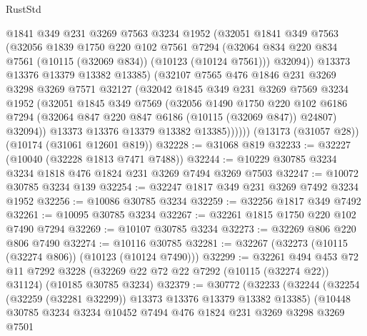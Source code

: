 \begin{lexlean}{RustStd}
\begin{coremodule}
              @1841
              @349
              @231
              @3269
              @7563
              @3234
              @1952
              (@32051
                @1841
                @349
                @7563
                (@32056
                  @1839
                  @1750
                  @220
                  @102
                  @7561
                  @7294
                  (@32064 @834 @220 @834 @7561 (@10115 (@32069 @834)) (@10123 (@10124 @7561)))
                  @32094))
              @13373
              @13376
              @13379
              @13382
              @13385)
            (@32107
              @7565
              @476
              @1846
              @231
              @3269
              @3298
              @3269
              @7571
              @32127
              (@32042
                @1845
                @349
                @231
                @3269
                @7569
                @3234
                @1952
                (@32051
                  @1845
                  @349
                  @7569
                  (@32056
                    @1490
                    @1750
                    @220
                    @102
                    @6186
                    @7294
                    (@32064 @847 @220 @847 @6186 (@10115 (@32069 @847)) @24807)
                    @32094))
                @13373
                @13376
                @13379
                @13382
                @13385))))))
    (@13173 (@31057 @28))
    (@10174 (@31061 @12601 @819))
@32228 := @31068 @819
@32233 := @32227 (@10040 (@32228 @1813 @7471 @7488))
@32244 := @10229 @30785 @3234 @3234 @1818 @476 @1824 @231 @3269 @7494 @3269 @7503
@32247 := @10072 @30785 @3234 @139
@32254 := @32247 @1817 @349 @231 @3269 @7492 @3234 @1952
@32256 := @10086 @30785 @3234
@32259 := @32256 @1817 @349 @7492
@32261 := @10095 @30785 @3234
@32267 := @32261 @1815 @1750 @220 @102 @7490 @7294
@32269 := @10107 @30785 @3234
@32273 := @32269 @806 @220 @806 @7490
@32274 := @10116 @30785
@32281 := @32267 (@32273 (@10115 (@32274 @806)) (@10123 (@10124 @7490)))
@32299 := @32261
    @494
    @453
    @72
    @11
    @7292
    @3228
    (@32269 @22 @72 @22 @7292 (@10115 (@32274 @22)) @31124)
    (@10185 @30785 @3234)
@32379 := @30772
    (@32233
      (@32244
        (@32254 (@32259 (@32281 @32299)) @13373 @13376 @13379 @13382 @13385)
        (@10448
          @30785
          @3234
          @3234
          @10452
          @7494
          @476
          @1824
          @231
          @3269
          @3298
          @3269
          @7501

\end{coremodule}
\end{lexlean}
